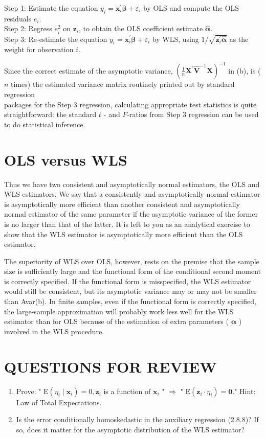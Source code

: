 \documentclass[10pt]{article}
\begin{document}
Step 1: Estimate the equation $y_{i}=\mathbf{x}_{i}^{\prime} \boldsymbol{\beta}+\varepsilon_{i}$ by OLS and compute the OLS residuals $e_{i}$.\\
Step 2: Regress $e_{i}^{2}$ on $\mathbf{z}_{i}$, to obtain the OLS coefficient estimate $\hat{\boldsymbol{\alpha}}$.\\
Step 3: Re-estimate the equation $y_{i}=\mathbf{x}_{i}^{\prime} \boldsymbol{\beta}+\varepsilon_{i}$ by WLS, using $1 / \sqrt{\mathbf{z}_{i}^{\prime} \hat{\boldsymbol{\alpha}}}$ as the weight for observation $i$.

Since the correct estimate of the asymptotic variance, $\left(\frac{1}{n} \mathbf{X}^{\prime} \widehat{\mathbf{V}}^{-1} \mathbf{X}\right)^{-1}$ in (b), is ( $n$ times) the estimated variance matrix routinely printed out by standard regression\\
packages for the Step 3 regression, calculating appropriate test statistics is quite straightforward: the standard $t$ - and $F$-ratios from Step 3 regression can be used to do statistical inference.

\section*{OLS versus WLS}
Thus we have two consistent and asymptotically normal estimators, the OLS and WLS estimators. We say that a consistently and asymptotically normal estimator is asymptotically more efficient than another consistent and asymptotically normal estimator of the same parameter if the asymptotic variance of the former is no larger than that of the latter. It is left to you as an analytical exercise to show that the WLS estimator is asymptotically more efficient than the OLS estimator.

The superiority of WLS over OLS, however, rests on the premise that the sample size is sufficiently large and the functional form of the conditional second moment is correctly specified. If the functional form is misspecified, the WLS estimator would still be consistent, but its asymptotic variance may or may not be smaller than Avar(b). In finite samples, even if the functional form is correctly specified, the large-sample approximation will probably work less well for the WLS estimator than for OLS because of the estimation of extra parameters ( $\boldsymbol{\alpha}$ ) involved in the WLS procedure.

\section*{QUESTIONS FOR REVIEW}
\begin{enumerate}
  \item Prove: " $\mathrm{E}\left(\eta_{i} \mid \mathbf{x}_{i}\right)=0, \mathbf{z}_{i}$ is a function of $\mathbf{x}_{i}$ " $\Rightarrow$ " $\mathrm{E}\left(\mathbf{z}_{i} \cdot \eta_{i}\right)=\mathbf{0}$." Hint: Law of Total Expectations.
  \item Is the error conditionally homoskedastic in the auxiliary regression (2.8.8)? If so, does it matter for the asymptotic distribution of the WLS estimator?
\end{enumerate}
\end{document}
